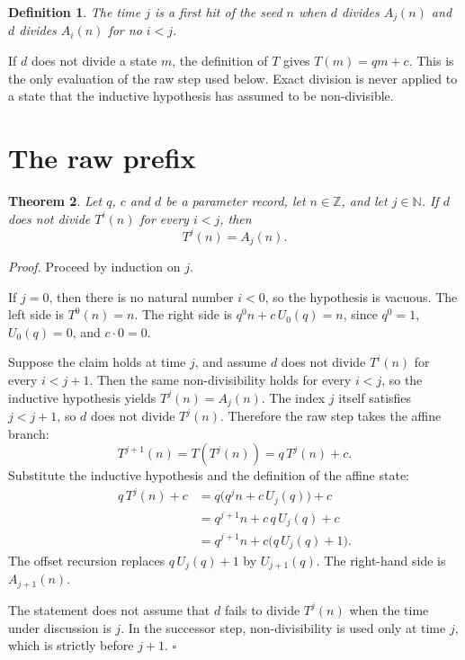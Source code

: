 \documentclass[11pt,letterpaper]{article}
\newcommand{\N}{\mathbb{N}}
\newcommand{\Z}{\mathbb{Z}}
\newtheorem{theorem}{Theorem}
\newtheorem{definition}[theorem]{Definition}
\newenvironment{proof}{\noindent\textit{Proof.}}{\hfill\(\square\)}
\begin{document}
\begin{definition}\label{Def:FirstHit}
The time \(j\) is a first hit of the seed \(n\) when \(d\) divides \(A_{j}(n)\) and \(d\) divides \(A_{i}(n)\) for no \(i<j\).
\end{definition}

If \(d\) does not divide a state \(m\), the definition of \(T\) gives \(T(m)=qm+c\). This is the only evaluation of the raw step used below. Exact division is never applied to a state that the inductive hypothesis has assumed to be non-divisible.

\section{The raw prefix}

\begin{theorem}\label{Thm:PrefixAffine}
Let \(q\), \(c\) and \(d\) be a parameter record, let \(n\in\Z\), and let \(j\in\N\). If \(d\) does not divide \(T^{i}(n)\) for every \(i<j\), then
\[
T^{j}(n)=A_{j}(n).
\]
\end{theorem}

\begin{proof}
Proceed by induction on \(j\).

If \(j=0\), then there is no natural number \(i<0\), so the hypothesis is vacuous. The left side is \(T^{0}(n)=n\). The right side is \(q^{0}n+c\,U_{0}(q)=n\), since \(q^{0}=1\), \(U_{0}(q)=0\), and \(c\cdot 0=0\).

Suppose the claim holds at time \(j\), and assume \(d\) does not divide \(T^{i}(n)\) for every \(i<j+1\). Then the same non-divisibility holds for every \(i<j\), so the inductive hypothesis yields \(T^{j}(n)=A_{j}(n)\). The index \(j\) itself satisfies \(j<j+1\), so \(d\) does not divide \(T^{j}(n)\). Therefore the raw step takes the affine branch:
\[
T^{j+1}(n)=T(T^{j}(n))=q\,T^{j}(n)+c.
\]
Substitute the inductive hypothesis and the definition of the affine state:
\begin{align*}
q\,T^{j}(n)+c
&= q\bigl(q^{j}n+c\,U_{j}(q)\bigr)+c \\
&= q^{j+1}n+c\,q\,U_{j}(q)+c \\
&= q^{j+1}n+c\bigl(q\,U_{j}(q)+1\bigr).
\end{align*}
The offset recursion replaces \(q\,U_{j}(q)+1\) by \(U_{j+1}(q)\). The right-hand side is \(A_{j+1}(n)\).

The statement does not assume that \(d\) fails to divide \(T^{j}(n)\) when the time under discussion is \(j\). In the successor step, non-divisibility is used only at time \(j\), which is strictly before \(j+1\).
\end{proof}
\end{document}
